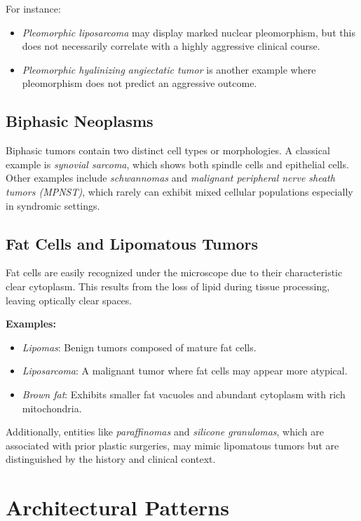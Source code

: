 For instance:
\begin{itemize}
    \item \emph{Pleomorphic liposarcoma} may display marked nuclear pleomorphism, but this does not necessarily correlate with a highly aggressive clinical course.
    \item \emph{Pleomorphic hyalinizing angiectatic tumor} is another example where pleomorphism does not predict an aggressive outcome.
\end{itemize}

\subsection{Biphasic Neoplasms}
Biphasic tumors contain two distinct cell types or morphologies. A classical example is \emph{synovial sarcoma}, which shows both spindle cells and epithelial cells. Other examples include \emph{schwannomas} and \emph{malignant peripheral nerve sheath tumors (MPNST)}, which rarely can exhibit mixed cellular populations especially in syndromic settings.

\subsection{Fat Cells and Lipomatous Tumors}
Fat cells are easily recognized under the microscope due to their characteristic clear cytoplasm. This results from the loss of lipid during tissue processing, leaving optically clear spaces.

\textbf{Examples:}
\begin{itemize}
    \item \emph{Lipomas}: Benign tumors composed of mature fat cells.
    \item \emph{Liposarcoma}: A malignant tumor where fat cells may appear more atypical.
    \item \emph{Brown fat}: Exhibits smaller fat vacuoles and abundant cytoplasm with rich mitochondria.
\end{itemize}

Additionally, entities like \emph{paraffinomas} and \emph{silicone granulomas}, which are associated with prior plastic surgeries, may mimic lipomatous tumors but are distinguished by the history and clinical context.

\section{Architectural Patterns}


